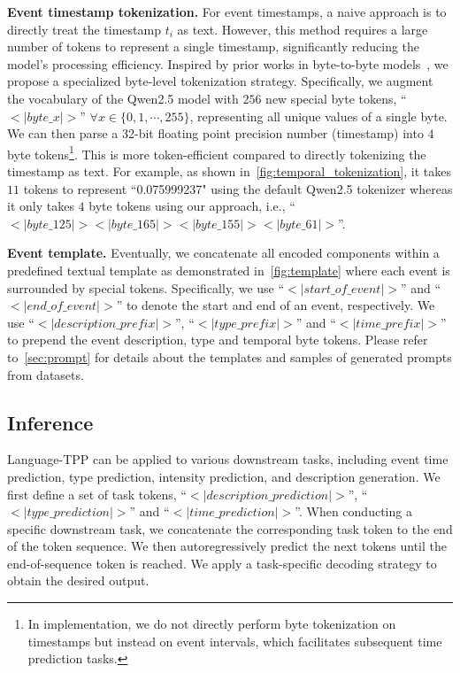 \textbf{Event timestamp tokenization.}
For event timestamps, a naive approach is to directly treat the timestamp \(t_i\) as text. However, this method requires a large number of tokens to represent a single timestamp, significantly reducing the model's processing efficiency.  
Inspired by prior works in byte-to-byte models~\citep{xue2022byt5,pagnoni2024byte}, we propose a specialized byte-level tokenization strategy. 
Specifically, we augment the vocabulary of the Qwen2.5 model with $256$ new special byte tokens, ``$<|byte\_x|>$'' $\forall x \in \{0,1,\cdots,255\}$, representing all unique values of a single byte. 
We can then parse a 32-bit floating point precision number (timestamp) into $4$ byte tokens\footnote{In implementation, we do not directly perform byte tokenization on timestamps but instead on event intervals, which facilitates subsequent time prediction tasks.}. 
This is more token-efficient compared to directly tokenizing the timestamp as text. 
For example, as shown in~\cref{fig:temporal_tokenization}, it takes $11$ tokens to represent ``0.075999237" using the default Qwen2.5 tokenizer whereas it only takes $4$ byte tokens using our approach, i.e., ``$<|byte\_125|><|byte\_165|><|byte\_155|><|byte\_61|>$''. 

\textbf{Event template.}
Eventually, we concatenate all encoded components within a predefined textual template as demonstrated in~\cref{fig:template} where each event is surrounded by special tokens. Specifically, we use ``$<|start\_of\_event|>$'' and ``$<|end\_of\_event|>$'' to denote the start and end of an event, respectively. We use ``$<|description\_prefix|>$'', ``$<|type\_prefix|>$'' and ``$<|time\_prefix|>$'' to prepend the event description, type and temporal byte tokens. 
Please refer to~\cref{sec:prompt}
for details about the templates and samples of generated prompts from datasets. 

\subsection{Inference}
Language-TPP can be applied to various downstream tasks, including event time prediction, type prediction, intensity prediction, and description generation.
We first define a set of task tokens, ``$<|description\_prediction|>$'', ``$<|type\_prediction|>$'' and ``$<|time\_prediction|>$''.
When conducting a specific downstream task, we concatenate the corresponding task token to the end of the token sequence. 
We then autoregressively predict the next tokens until the end-of-sequence token is reached. 
We apply a task-specific decoding strategy to obtain the desired output. 

